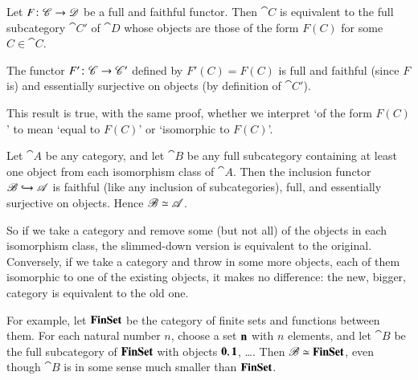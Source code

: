 \begin{cor}
\label{cor:ff-emb}
Let $F\from \cat{C} \to \cat{D}$ be a full and faithful functor.  Then
$\cat{C}$ is equivalent to the full subcategory $\cat{C}'$ of $\cat{D}$
whose objects are those of the form $F(C)$ for some $C \in \cat{C}$.
\end{cor}

\begin{pf}
The functor $F'\from \cat{C} \to \cat{C}'$ defined by $F'(C) = F(C)$ is
full and faithful (since $F$ is) and essentially surjective on objects (by
definition of $\cat{C}'$).
\end{pf}

This result is true, with the same proof, whether we interpret `of the form
$F(C)$' to mean `equal to $F(C)$' or `isomorphic to $F(C)$'.

\begin{example}
\label{eg:equivs-skellish}
Let $\cat{A}$ be any category, and let $\cat{B}$ be any full subcategory
containing at least one object from each isomorphism class of $\cat{A}$.
Then the inclusion functor $\mathscr{B} \hookrightarrow \mathscr{A}$ is faithful (like any
inclusion of subcategories), full, and essentially surjective on objects.
Hence $\mathscr{B} \simeq \mathscr{A}$.

So if we take a category and remove some (but not all) of the objects in
each isomorphism class, the slimmed-down%
%
%
version is equivalent to the original.  Conversely, if we take a category
and throw in some more objects, each of them isomorphic to one of the
existing objects, it makes no difference: the new, bigger, category is
equivalent to the old one.

For example, let $\mathbf{FinSet}$%
%
%
be the category of finite%
%
%
sets and functions between them.  For each natural number $n$, choose a set
$\mathbf{n}$ with $n$ elements, and let $\cat{B}$ be the full subcategory of
$\mathbf{FinSet}$ with objects $\mathbf{0}, \mathbf{1}$, \ldots.  Then $\mathscr{B} \simeq
\mathbf{FinSet}$, even though $\cat{B}$ is in some sense much smaller than
$\mathbf{FinSet}$.
\end{example}

